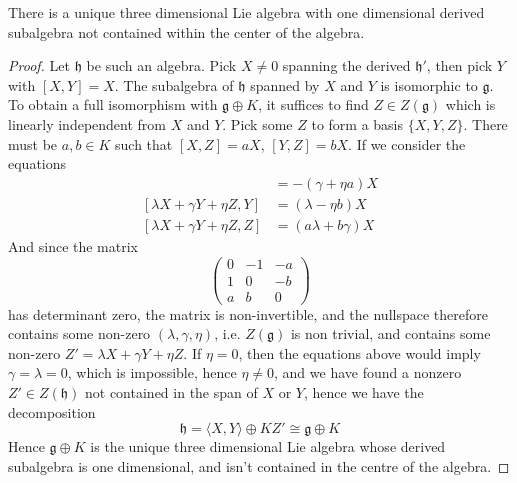 \begin{theorem}
    There is a unique three dimensional Lie algebra with one dimensional derived subalgebra not contained within the center of the algebra.
\end{theorem}
\begin{proof}
    Let $\mathfrak{h}$ be such an algebra. Pick $X \neq 0$ spanning the derived $\mathfrak{h}'$, then pick $Y$ with $[X,Y] = X$. The subalgebra of $\mathfrak{h}$ spanned by $X$ and $Y$ is isomorphic to $\mathfrak{g}$. To obtain a full isomorphism with $\mathfrak{g} \oplus K$, it suffices to find $Z \in Z(\mathfrak{g})$ which is linearly independent from $X$ and $Y$. Pick some $Z$ to form a basis $\{ X, Y, Z \}$. There must be $a, b \in K$ such that $[X,Z] = aX$, $[Y,Z] = bX$. If we consider the equations
    \begin{align*}
        [\lambda X + \gamma Y + \eta Z, X] &= -(\gamma + \eta a) X\\
        [\lambda X + \gamma Y + \eta Z, Y] &= (\lambda - \eta b) X\\
        [\lambda X + \gamma Y + \eta Z, Z] &= (a \lambda + b \gamma) X
    \end{align*}
    And since the matrix 
    \[ \begin{pmatrix} 0 & -1 & -a \\ 1 & 0 & -b \\ a & b & 0 \end{pmatrix} \]
    has determinant zero, the matrix is non-invertible, and the nullspace therefore contains some non-zero $(\lambda, \gamma, \eta)$, i.e. $Z(\mathfrak{g})$ is non trivial, and contains some non-zero $Z' = \lambda X + \gamma Y + \eta Z$. If $\eta = 0$, then the equations above would imply $\gamma = \lambda = 0$, which is impossible, hence $\eta \neq 0$, and we have found a nonzero $Z' \in Z(\mathfrak{h})$ not contained in the span of $X$ or $Y$, hence we have the decomposition
    \[ \mathfrak{h} = \langle X, Y \rangle \oplus KZ' \cong \mathfrak{g} \oplus K \]
    Hence $\mathfrak{g} \oplus K$ is the unique three dimensional Lie algebra whose derived subalgebra is one dimensional, and isn't contained in the centre of the algebra.
\end{proof}

